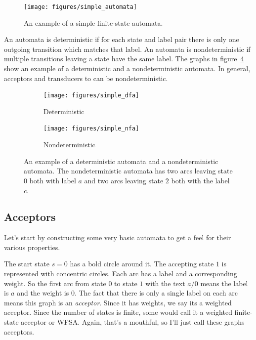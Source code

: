 \begin{figure}
    \centering
    \texttt{[image: figures/simple\_automata]}
    \caption{An example of a simple finite-state automata.}
    \label{fig:simple_automata}
 \end{figure}

An automata is deterministic if for each state and label pair there is only one
outgoing transition which matches that label. An automata is nondeterministic
if multiple transitions leaving a state have the same label. The graphs in
figure~\ref{fig:dfa_nfa} show an example of a deterministic and a
nondeterministic automata. In general, acceptors and transducers to can be
nondeterministic.

\begin{figure}
    \centering
    \begin{subfigure}[b]{0.48\textwidth}
        \texttt{[image: figures/simple\_dfa]}
        \caption{Deterministic}
        \label{fig:simple_dfa}
    \end{subfigure}
    \begin{subfigure}[b]{0.48\textwidth}
        \texttt{[image: figures/simple\_nfa]}
        \caption{Nondeterministic}
        \label{fig:simple_nfa}
    \end{subfigure}
    \caption{An example of a deterministic automata and a nondeterministic
    automata. The nondeterministic automata has two arcs leaving state $0$ both
    with label $a$ and two arcs leaving state $2$ both with the label $c$.}
    \label{fig:dfa_nfa}
\end{figure}

\subsection{Acceptors}

Let's start by constructing some very basic automata to get a feel for their
various properties.

The start state $s = 0$ has a bold circle around it. The accepting state $1$ is
represented with concentric circles. Each arc has a label and a corresponding
weight. So the first arc from state $0$ to state $1$ with the text $a/0$ means
the label is $a$ and the weight is $0$. The fact that there is only a single
label on each arc means this graph is an \emph{acceptor}. Since it has weights,
we say its a weighted acceptor. Since the number of states is finite, some
would call it a weighted finite-state acceptor or WFSA. Again, that's a
mouthful, so I'll just call these graphs acceptors.

